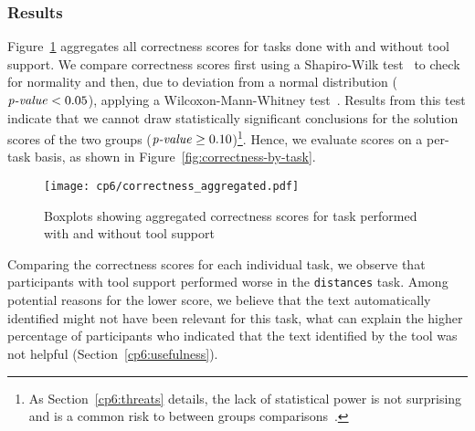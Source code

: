 

\subsubsection{Results}


Figure~\ref{fig:correctness-overall} aggregates all correctness scores for tasks done with and without tool support.
We compare correctness scores first using a Shapiro-Wilk test~\cite{wohlin2012} to check for normality and then, 
due to deviation from a normal distribution ($\text{\textit{p-value}} < 0.05$), applying a 
Wilcoxon-Mann-Whitney test~\cite{mannWhitneyU}.
Results from this test indicate that we cannot draw statistically significant conclusions
for the solution scores of the two groups ($\text{\textit{p-value}} \ge 0.10$)\footnote{
As Section~\ref{cp6:threats} details, the lack of statistical power is not surprising and is a common risk to between groups comparisons~\cite{Lazar2017-cp3}.}. Hence, we evaluate scores on a per-task basis, as shown in Figure~\ref{fig:correctness-by-task}.




\medskip
\begin{figure}
    \centering
    \texttt{[image: cp6/correctness\_aggregated.pdf]}
    \caption{Boxplots showing aggregated correctness scores for task performed with and without tool support}
    \label{fig:correctness-overall}
\end{figure}




Comparing the correctness scores for each individual task, we observe that participants with tool support performed worse in the \texttt{distances} task. 
Among potential reasons for the lower score, we believe that the text automatically identified 
might not have been relevant for this task, what can explain the higher percentage of participants
who indicated that the text identified by the tool was not helpful (Section~\ref{cp6:usefulness}).



